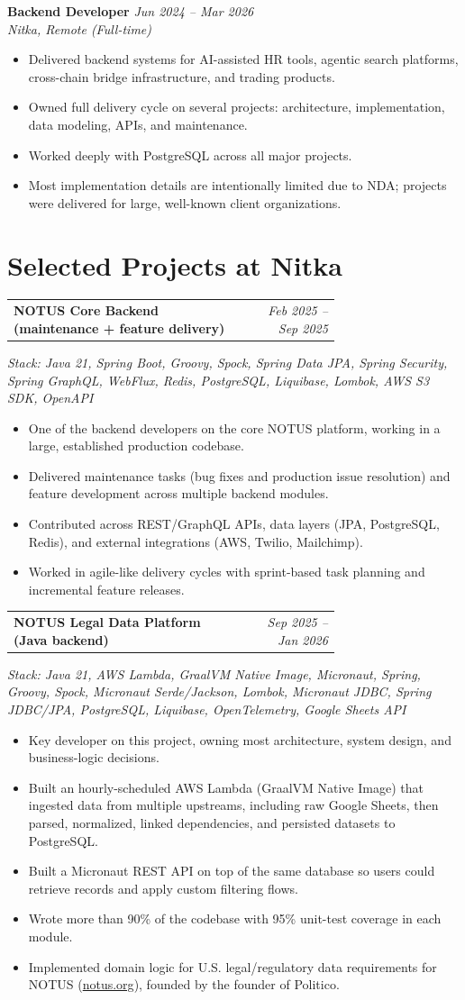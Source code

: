 \documentclass[11pt,a4paper]{article}
\makeatletter
\newcommand{\project}[4]{
  \begin{samepage}
  \vspace{0.35em}
  \noindent
  \begin{tabular*}{\linewidth}{@{}p{0.72\linewidth}@{\extracolsep{\fill}}r@{}}
    \textbf{#1} & \textit{#2} \\
  \end{tabular*}
  \textit{Stack: #3}
  \end{samepage}
  \begin{itemize}
    #4
  \end{itemize}
}
\makeatother
\begin{document}
\vspace{0.4em}
\textbf{Backend Developer} \hfill \textit{Jun 2024 -- Mar 2026} \\
\textit{Nitka, Remote (Full-time)}
\begin{itemize}
  \item Delivered backend systems for AI-assisted HR tools, agentic search platforms, cross-chain bridge infrastructure, and trading products.
  \item Owned full delivery cycle on several projects: architecture, implementation, data modeling, APIs, and maintenance.
  \item Worked deeply with PostgreSQL across all major projects.
  \item Most implementation details are intentionally limited due to NDA; projects were delivered for large, well-known client organizations.
\end{itemize}

\section*{Selected Projects at Nitka}
\project
  {NOTUS Core Backend (maintenance + feature delivery)}
  {Feb 2025 -- Sep 2025}
  {Java 21, Spring Boot, Groovy, Spock, Spring Data JPA, Spring Security, Spring GraphQL, WebFlux, Redis, PostgreSQL, Liquibase, Lombok, AWS S3 SDK, OpenAPI}
  {
    \item One of the backend developers on the core NOTUS platform, working in a large, established production codebase.
    \item Delivered maintenance tasks (bug fixes and production issue resolution) and feature development across multiple backend modules.
    \item Contributed across REST/GraphQL APIs, data layers (JPA, PostgreSQL, Redis), and external integrations (AWS, Twilio, Mailchimp).
    \item Worked in agile-like delivery cycles with sprint-based task planning and incremental feature releases.
  }

\project
  {NOTUS Legal Data Platform (Java backend)}
  {Sep 2025 -- Jan 2026}
  {Java 21, AWS Lambda, GraalVM Native Image, Micronaut, Spring, Groovy, Spock, Micronaut Serde/Jackson, Lombok, Micronaut JDBC, Spring JDBC/JPA, PostgreSQL, Liquibase, OpenTelemetry, Google Sheets API}
  {
    \item Key developer on this project, owning most architecture, system design, and business-logic decisions.
    \item Built an hourly-scheduled AWS Lambda (GraalVM Native Image) that ingested data from multiple upstreams, including raw Google Sheets, then parsed, normalized, linked dependencies, and persisted datasets to PostgreSQL.
    \item Built a Micronaut REST API on top of the same database so users could retrieve records and apply custom filtering flows.
    \item Wrote more than 90\% of the codebase with 95\% unit-test coverage in each module.
    \item Implemented domain logic for U.S. legal/regulatory data requirements for NOTUS (\url{notus.org}), founded by the founder of Politico.
  }
\end{document}
